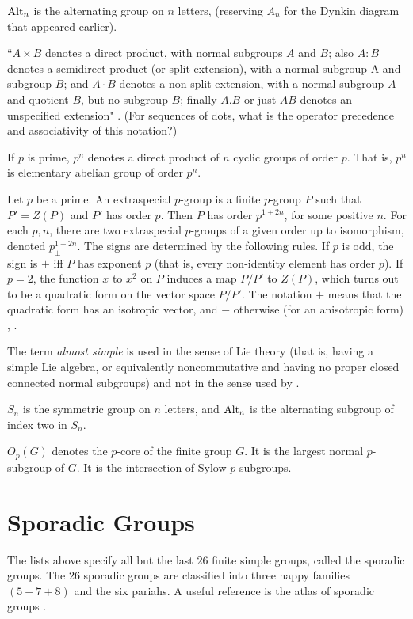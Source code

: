 $\text{Alt}_n$ is the alternating group on $n$ letters,
(reserving $A_n$ for the Dynkin diagram that appeared earlier).

``$A \times B$ denotes a direct product, with normal subgroups $A$ and
$B$; also $A:B$ denotes a semidirect product (or split extension),
with a normal subgroup A and subgroup $B$; and $A \cdot B$ denotes a
non-split extension, with a normal subgroup $A$ and quotient $B$, but
no subgroup $B$; finally $A.B$ or just $AB$ denotes an unspecified
extension" \cite[p.9]{wilson2009finite}. (For sequences of dots, what
is the operator precedence and associativity of this notation?)

If $p$ is prime, $p^n$ denotes a direct product of $n$ cyclic groups
of order $p$.  That is, $p^n$ is elementary abelian group of order
$p^n$.  \cite[p.9]{wilson2009finite}


Let $p$ be a prime.  An extraspecial $p$-group is a finite $p$-group
$P$ such that $P' = Z(P)$ and $P'$ has order $p$.  Then $P$ has order
$p^{1+2n}$, for some positive $n$.  For each $p,n$, there are two
extraspecial $p$-groups of a given order up to isomorphism, denoted
$p^{1+2n}_{\pm}$. The signs are determined by the following rules.  If
$p$ is odd, the sign is $+$ iff $P$ has exponent $p$ (that is, every
non-identity element has order $p$).  If $p=2$, the function $x$ to
$x^2$ on $P$ induces a map $P/P'$ to $Z(P)$, which turns out to be a
quadratic form on the vector space $P/P'$.  The notation $+$ means
that the quadratic form has an isotropic vector, and $-$ otherwise
(for an anisotropic form) \cite[p.19]{robert1998twelve},
\cite[pp.59,83]{wilson2009finite}.

The term {\it almost simple} is used in the sense of Lie theory (that
is, having a simple Lie algebra, or equivalently noncommutative and
having no proper closed connected normal subgroups) and not in the
sense used by \cite[p.22]{wilson2009finite}.

$S_n$ is the symmetric group on $n$ letters, and $\text{Alt}_n$ is the
alternating subgroup of index two in $S_n$.

$O_p(G)$ denotes the $p$-core of the finite group $G$.  It
is the largest normal $p$-subgroup of $G$.  It is the intersection
of Sylow $p$-subgroups.


\section{Sporadic Groups}

The lists above specify all but the last $26$ finite simple groups,
called the sporadic groups.  The $26$ sporadic groups are classified
into three happy families $(5+7+8)$ and the six pariahs.  A useful
reference is the atlas of sporadic groups \cite{A}.

